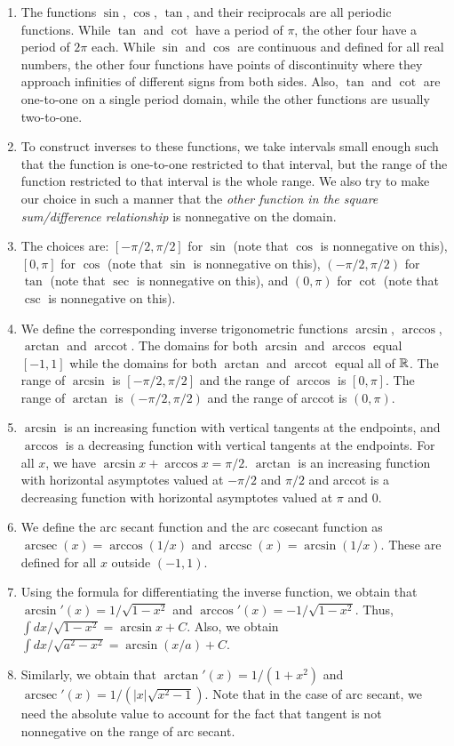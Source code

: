 \documentclass{amsart}
\begin{document}
\begin{enumerate}
\item The functions $\sin$, $\cos$, $\tan$, and their reciprocals are
  all periodic functions. While $\tan$ and $\cot$ have a period of
  $\pi$, the other four have a period of $2\pi$ each. While $\sin$ and
  $\cos$ are continuous and defined for all real numbers, the other
  four functions have points of discontinuity where they approach
  infinities of different signs from both sides. Also, $\tan$ and
  $\cot$ are one-to-one on a single period domain, while the other
  functions are usually two-to-one.
\item To construct inverses to these functions, we take intervals
  small enough such that the function is one-to-one restricted to that
  interval, but the range of the function restricted to that interval
  is the whole range. We also try to make our choice in such a manner
  that the {\em other function in the square sum/difference
  relationship} is nonnegative on the domain.
\item The choices are: $[-\pi/2,\pi/2]$ for $\sin$ (note that $\cos$
  is nonnegative on this), $[0,\pi]$ for $\cos$ (note that $\sin$ is
  nonnegative on this), $(-\pi/2,\pi/2)$ for $\tan$ (note that $\sec$
  is nonnegative on this), and $(0,\pi)$ for $\cot$ (note that $\csc$
  is nonnegative on this).
\item We define the corresponding inverse trigonometric functions
  $\arcsin$, $\arccos$, $\arctan$ and $\operatorname{arccot}$. The
  domains for both $\arcsin$ and $\arccos$ equal $[-1,1]$ while the
  domains for both $\arctan$ and $\operatorname{arccot}$ equal all of
  $\mathbb{R}$. The range of $\arcsin$ is $[-\pi/2, \pi/2]$ and the range of
  $\arccos$ is $[0,\pi]$. The range of $\arctan$ is $(-\pi/2,\pi/2)$
  and the range of arccot is $(0,\pi)$.
\item $\arcsin$ is an increasing function with vertical tangents at
  the endpoints, and $\arccos$ is a decreasing function with vertical
  tangents at the endpoints. For all $x$, we have $\arcsin x + \arccos
  x = \pi/2$. $\arctan$ is an increasing function with horizontal
  asymptotes valued at $-\pi/2$ and $\pi/2$ and arccot is a decreasing
  function with horizontal asymptotes valued at $\pi$ and $0$.
\item We define the arc secant function and the arc cosecant function
  as $\operatorname{arcsec}(x) = \arccos(1/x)$ and
  $\operatorname{arccsc}(x) = \arcsin(1/x)$. These are defined for all
  $x$ outside $(-1,1)$.
\item Using the formula for differentiating the inverse function, we
  obtain that $\arcsin'(x) = 1/\sqrt{1 - x^2}$ and $\arccos'(x) =
  -1/\sqrt{1 - x^2}$. Thus, $\int dx/\sqrt{1 - x^2} = \arcsin x +
  C$. Also, we obtain $\int dx/\sqrt{a^2 - x^2} = \arcsin(x/a) + C$.
\item Similarly, we obtain that $\arctan'(x) = 1/(1 + x^2)$ and
  $\operatorname{arcsec}'(x) = 1/(|x|\sqrt{x^2 - 1})$. Note that in
  the case of arc secant, we need the absolute value to account for
  the fact that tangent is not nonnegative on the range of arc secant.
\end{enumerate}
\end{document}
